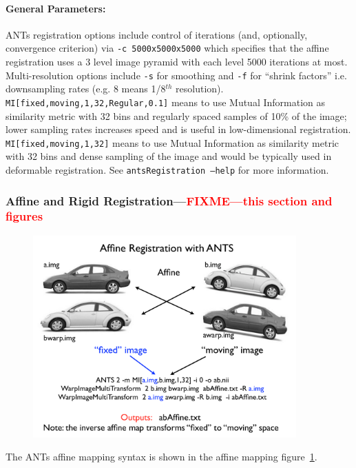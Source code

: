 \documentclass{InsightArticle}
\begin{document}
\paragraph{General Parameters:} ANTs registration options include control of iterations (and,
optionally, convergence criterion) via
\texttt{-c 5000x5000x5000} which specifies that the affine registration
uses a 3 level image pyramid with each level 5000 iterations at
most.  Multi-resolution options include \texttt{-s} for smoothing and
\texttt{-f} for ``shrink factors'' i.e. downsampling rates (e.g. 8
means 1/8$^{th}$ resolution).  
\texttt{MI[fixed,moving,1,32,Regular,0.1]} means to use Mutual
Information as similarity metric with 32 bins and regularly spaced
samples of 10\% of the image; lower sampling rates increases speed and
is useful in low-dimensional registration.  \texttt{MI[fixed,moving,1,32]} means to use Mutual
Information as similarity metric with 32 bins and dense sampling of
the image and would be typically used in deformable registration. See \texttt{antsRegistration --help}
for more information. 

\subsubsection{Affine and Rigid
  Registration---\textcolor{red}{FIXME---this section and figures}}


\begin{figure}
\includegraphics[width=0.9\textwidth]{./Figures/ANTSanatomy.pdf} 
\vspace{-0.1in}
\label{fig:aff}
\end{figure}
The ANTs affine mapping syntax is shown in the affine mapping
figure~\ref{fig:aff}. 
\end{document}
